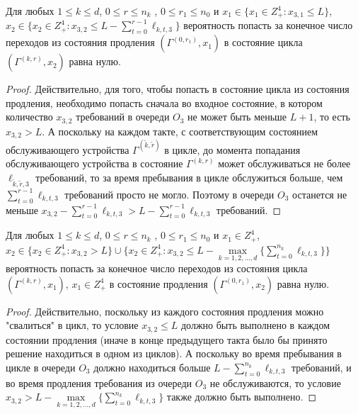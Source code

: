 \documentclass[a4paper,12pt,russian]{extarticle}
\newcommand{\ga}[1]{\Gamma^{\left( #1 \right)} }
\begin{document}
\begin{lemma}
Для любых $1 \leqslant k \leqslant d$, $0 \leqslant r \leqslant n_k$ , $0 \leqslant r_1 \leqslant n_0$ и $x_1 \in \{x_1 \in Z_+^4 \colon x_{3,1}\leqslant L\}$, $x_2 \in \{x_2 \in Z_+^4 \colon x_{3,2} \leqslant L -\sum_{t=0}^{r-1} \ell_{k,t,3}\}$ вероятность попасть за конечное число переходов из состояния продления $(\ga{0,r_1},x_1)$ в состояние цикла $(\ga{k,r},x_2)$ равна нулю.
\label{lemma:7}
\end{lemma}
\begin{proof}
Действительно, для того, чтобы попасть в состояние цикла из состояния продления, необходимо попасть сначала во входное состояние, в котором количество $x_{3,2}$ требований в очереди $O_3$ не может быть меньше $L+1$, то есть $x_{3,2} > L$. А поскольку на каждом такте, с соответствующим состоянием обслуживающего устройства $\ga{\tilde{k},\tilde{r}}$ в цикле, до момента попадания обслуживающего устройства в состояние $\ga{k,r}$ может обслуживаться не более $\ell_{\tilde{k},\tilde{r}, 3}$ требований, то за время пребывания в цикле обслужиться больше, чем $\sum_{t=0}^{r-1} \ell_{k,t,3}$ требований просто не могло. Поэтому в очереди $O_3$ останется не меньше $x_{3,2} -\sum_{t=0}^{r-1} \ell_{k,t,3}> L - \sum_{t=0}^{r-1} \ell_{k,t,3}$ требований.
\end{proof}

\begin{lemma}
Для любых $1 \leqslant k \leqslant d$, $0 \leqslant r \leqslant n_k$ , $0 \leqslant r_1 \leqslant n_0$ и $x_1 \in Z_+^4$,  $x_2 \in \{x_2 \in Z_+^4 \colon x_{3,2} > L \} \cup \{x_2 \in Z_+^4 \colon x_{3,2} \leqslant L -  \max\limits_{k=1, 2, \ldots, d}\{\sum_{t=0}^{n_k} \ell_{k,t,3}\} \} $ вероятность попасть за конечное число переходов из состояния цикла  $(\ga{k,r},x_1)$, $x_1 \in Z_+^4$ в состояние продления $(\ga{0,r_1},x_2)$ равна нулю.
\label{lemma:8}
\end{lemma}
\begin{proof}
Действительно, поскольку из каждого состояния продления можно "свалиться" в цикл, то условие $x_{3,2} \leqslant L$ должно быть выполнено в каждом состоянии продления (иначе в конце предыдущего такта было бы принято решение находиться в одном из циклов). А поскольку во время пребывания в цикле в очереди $O_3$ должно находиться больше $L -  \sum_{t=0}^{n_k} \ell_{k,t,3}$ требований, и во время продления требования из очереди $O_3$ не обслуживаются, то условие $x_{3,2} > L -  \max\limits_{k=1, 2, \ldots, d}\{\sum_{t=0}^{n_k} \ell_{k,t,3}\}$ также должно быть выполнено.
\end{proof}
\end{document}
